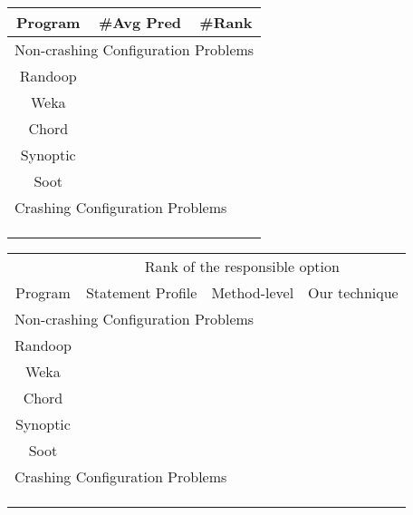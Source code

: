 
\begin{table}[t]
\setlength{\tabcolsep}{.84\tabcolsep}
\begin{tabular}{|c|c|c|}
\hline
 Program &  \#Avg Pred & \#Rank \\
 \hline
\hline
\multicolumn{3}{|l|}{Non-crashing Configuration Problems}   \\
 \hline
 Randoop & &    \\
\hline
 Weka &  &   \\
\hline
 Chord & & \\
\hline
 Synoptic & &  \\
\hline
 Soot &  &    \\
\hline
\hline
\multicolumn{3}{|l|}{Crashing Configuration Problems}   \\
\hline
& & \\
\hline
& & \\
\hline
& & \\
\hline
\end{tabular}

\end{table}


\begin{table}[t]
\setlength{\tabcolsep}{.54\tabcolsep}
\begin{tabular}{|c|c|c|c|}
\hline
 & \multicolumn{3}{|c|}{Rank of the responsible option} \\
\cline{2-4}
 Program & Statement Profile& Method-level & Our technique \\
 \hline
\hline
\multicolumn{4}{|l|}{Non-crashing Configuration Problems}   \\
 \hline
 Randoop & & &  \\
\hline
 Weka &  & &  \\
\hline
 Chord & & &  \\
\hline
 Synoptic & & &  \\
\hline
 Soot &  &  &  \\
\hline
\hline
\multicolumn{4}{|l|}{Crashing Configuration Problems}   \\
\hline
& & & \\
\hline
& & & \\
\hline
& & & \\
\hline
\end{tabular}

\end{table}


